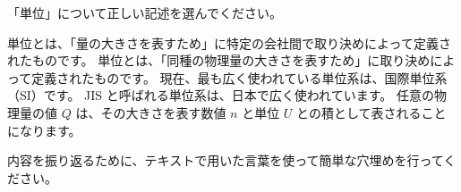 \documentclass[uplatex,dvipdfmx,a4paper,11pt]{jsreport}
\begin{document}
\begin{qlist}
\begin{qlist2}
		\end{qlist2}
    \vspace{3mm}
	\qitem 「単位」について正しい記述を選んでください。
		\begin{qlist2}
			\qitem 単位とは、「量の大きさを表すため」に特定の会社間で取り決めによって定義されたものです。
			\qitem 単位とは、「同種の物理量の大きさを表すため」に取り決めによって定義されたものです。
			\qitem 現在、最も広く使われている単位系は、国際単位系（SI）です。
			\qitem JIS と呼ばれる単位系は、日本で広く使われています。
			\qitem 任意の物理量の値 $Q$ は、その大きさを表す数値 $n$ と単位 $U$ との積として表されることになります。
		\end{qlist2}
\end{qlist}

内容を振り返るために、テキストで用いた言葉を使って簡単な穴埋めを行ってください。
\end{document}
